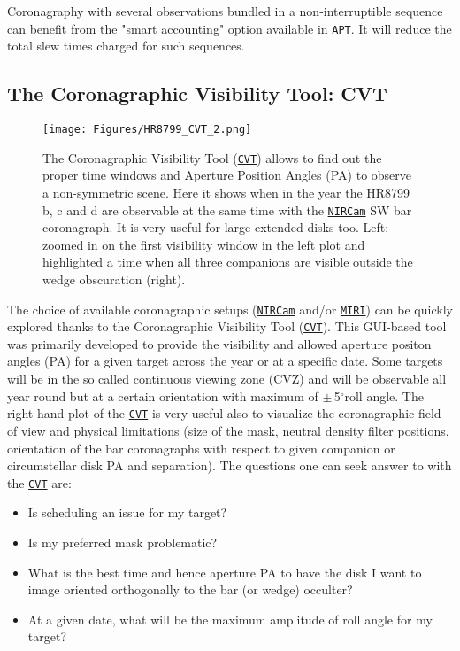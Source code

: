 \documentclass[]{spie}  %
\newcommand{\arcdeg}{\mbox{$^{\circ}$}}
\newcommand{\nircam}{{\tt \href{https://jwst.stsci.edu/instrumentation/nircam}{NIRCam}}\xspace}
\newcommand{\miri}{{\tt \href{https://jwst.stsci.edu/instrumentation/miri}{MIRI}}\xspace}
\newcommand{\apt}{{\tt \href{http://www.stsci.edu/hst/proposing/apt}{APT}}\xspace}
\newcommand{\cvt}{{\tt \href{https://jwst-docs.stsci.edu/display/JPP/JWST+Coronagraphic+Visibility+Tool+Help}{CVT}}\xspace}
\def\begini{\begin{itemize}[itemsep=0.5pt,topsep=0.5pt]}
\def\endi{\end{itemize}}
\begin{document}
Coronagraphy with several observations bundled in a non-interruptible sequence can benefit from the "smart accounting" option available in \apt. It will reduce the total slew times charged for such sequences.

\subsection{The Coronagraphic Visibility Tool: CVT}
\label{sec:cvt}

\begin{figure}[h!]
\begin{center}
\texttt{[image: Figures/HR8799\_CVT\_2.png]}
\caption{The Coronagraphic Visibility Tool (\cvt) allows to find out the proper time windows and Aperture Position Angles (PA) to observe a non-symmetric scene. Here it shows when in the year the HR8799\cite{marois2008_hr8799, marois2010_hr8799e} b, c and d are observable at the same time with the \nircam SW bar coronagraph. It is very useful for large extended disks too. Left: zoomed in on the first visibility window in the left plot and highlighted a time when all three companions are visible outside the wedge obscuration (right).}
\label{fig:jwst-cvt}
\end{center}
\end{figure}

The choice of available coronagraphic setups (\nircam and/or \miri) can be quickly explored thanks to the Coronagraphic Visibility Tool (\cvt)\cite{jdox_cvt}. This GUI-based tool was primarily developed to provide the visibility and allowed aperture positon angles (PA) for a given target across the year or at a specific date. Some targets will be in the so called continuous viewing zone (CVZ) and will be observable all year round but at a certain orientation with maximum of $\pm\,$5\arcdeg roll angle. The right-hand plot of the \cvt is very useful also to visualize the coronagraphic field of view and physical limitations (size of the mask, neutral density filter positions, orientation of the bar coronagraphs with respect to given companion or circumstellar disk PA and separation). The questions one can seek answer to with the \cvt are:
\begini 
\item Is scheduling an issue for my target? 
\item Is my preferred mask problematic?
\item What is the best time and hence aperture PA to have the disk I want to image oriented orthogonally to the bar (or wedge) occulter?
\item At a given date, what will be the maximum amplitude of roll angle for my target?
\endi
\end{document}
